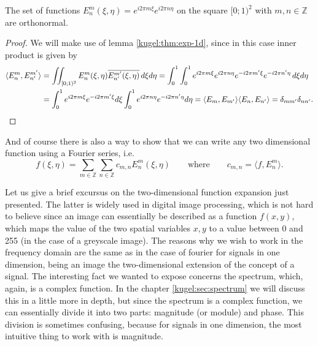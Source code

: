\begin{lemma}
  The set of functions \(E^m_n(\xi, \eta) = e^{i2\pi m\xi}e^{i2\pi n\eta}\)
  on the square \([0; 1)^2\) with \(m, n \in \mathbb{Z} \) are orthonormal.
\end{lemma}
\begin{proof}
  We will make use of lemma \ref{kugel:thm:exp-1d}, since in this case inner
  product is given by
  \begin{align*}
    \langle E^m_n, E^{m'}_{n'} \rangle
    &= \iint_{[0;1)^2}
        E^m_n(\xi, \eta) \overline{E^{m'}_{n'} (\xi, \eta)}
      \, d\xi d\eta
    = \int_0^1 \int_0^1
        e^{i2\pi m\xi} e^{i2\pi n\eta}
        e^{-i2\pi m'\xi} e^{-i2\pi n'\eta}
      \, d\xi d\eta
      \\
    &= \int_0^1 e^{i2\pi m\xi} e^{-i2\pi m'\xi} d\xi 
      \int_0^1 e^{i2\pi n\eta} e^{-i2\pi n'\eta} d\eta
    = \langle E_m, E_{m'} \rangle \langle E_n, E_{n'} \rangle
    = \delta_{mm'} \delta_{nn'}
    .\qedhere
  \end{align*}
\end{proof}

And of course there is also a way to show that we can write any two
dimensional function using a Fourier series, i.e.
\begin{equation*}
  f(\xi, \eta) = \sum_{m \in \mathbb{Z}} \sum_{n \in \mathbb{Z}}
    c_{m, n} E^m_n(\xi, \eta)
    \qquad\text{where}\qquad
    c_{m,n} = \langle f, E^m_n \rangle.
\end{equation*}

Let us give a brief excursus on the two-dimensional function expansion just presented. The latter is widely used in digital image processing, 
which is not hard to believe since an image can essentially be described as a function $f(x,y)$, which maps the value of the two spatial 
variables $x,y$ to a value between 0 and 255 (in the case of a greyscale image).
The reasons why we wish to work in the frequency domain are the same as in the case of fourier for signals in one dimension, being an image 
the two-dimensional extension of the concept of a signal. The interesting fact we wanted to expose concerns the spectrum, which, again, is a 
complex function. In the chapter \ref{kugel:sec:spectrum} we will discuss this in a little more in depth, but since the spectrum is a complex 
function, we can essentially divide it into two parts: magnitude (or module) and phase. This division is sometimes confusing, because for signals 
in one dimension, the most intuitive thing to work with is magnitude.

